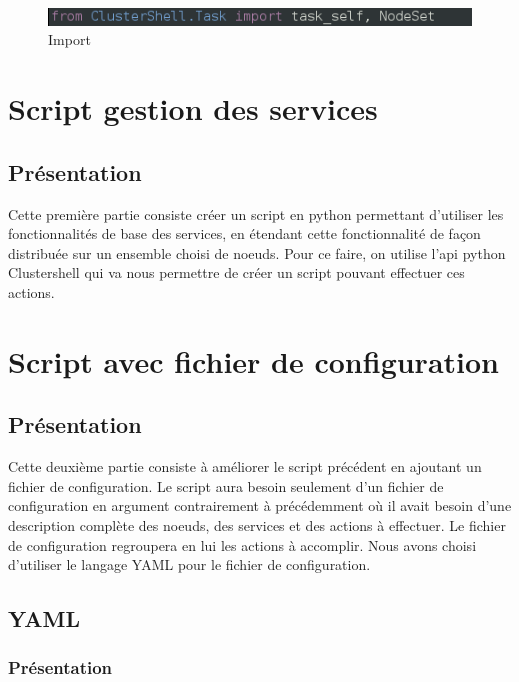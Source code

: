 \documentclass[a4paper,11pt]{article}
\begin{document}
\begin{figure}[hbtp]
\centering
\includegraphics[scale=0.7]{from_clustershell.png}
\caption{Import}
\end{figure}

\pagebreak
\section{Script gestion des services}
\label{sec:section3}
\subsection{Présentation}
\label{sub:3.1}

Cette première partie consiste créer un script en python permettant d'utiliser les fonctionnalités de base des services, en étendant cette fonctionnalité de façon distribuée sur un ensemble choisi de noeuds.
Pour ce faire, on utilise l'api python Clustershell qui va nous permettre de créer un script pouvant effectuer ces actions.


\pagebreak


\section{Script avec fichier de configuration}
\label{sec:section4}
\subsection{Présentation}
\label{sub:4.1}

Cette deuxième partie consiste à améliorer le script précédent en ajoutant un fichier de configuration. Le script aura besoin seulement d'un fichier de configuration en argument contrairement à précédemment où il avait besoin d'une description complète des noeuds, des services et des actions à effectuer. Le fichier de configuration regroupera en lui les actions à accomplir. Nous avons choisi d'utiliser le langage YAML pour le fichier de configuration.

\subsection{YAML}
\label{sub:4.2}
\subsubsection{Présentation}
\label{subsub:4.2.1}
\end{document}
